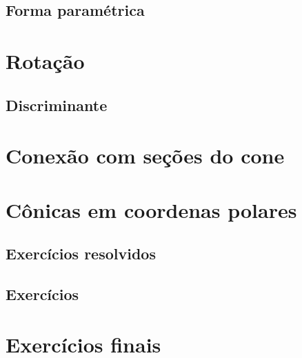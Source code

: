 \subsection{Forma paramétrica}

\section{Rotação}
\subsection{Discriminante}


\section{Conexão com seções do cone}

\section{Cônicas em coordenas polares}


\subsection*{Exercícios resolvidos}

\construirExeresol

\subsection*{Exercícios}

\construirExer

\section{Exercícios finais}

\construirExer

